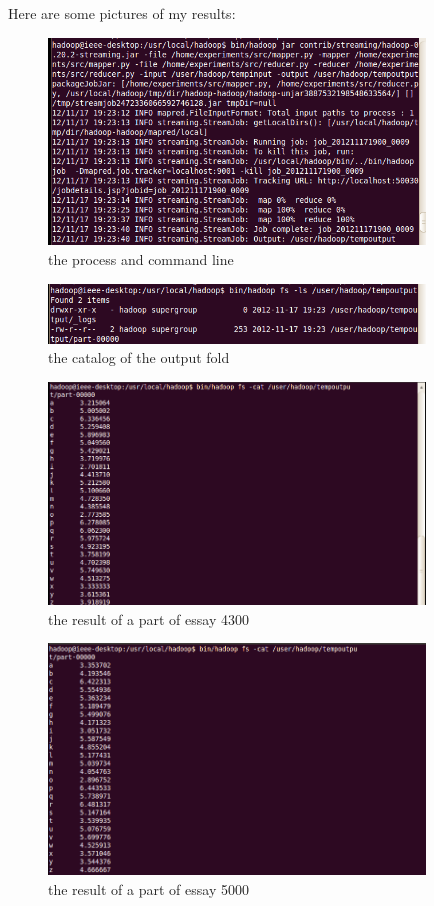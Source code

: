 \documentclass{article}
\begin{document}
Here are some pictures of my results:\\
\begin{figure}[htbp]
\centering
\includegraphics[width=10cm]{6.png}
\caption{the process and command line}
\end{figure}
\begin{figure}[htbp]
\centering
\includegraphics[width=10cm]{7.png}
\caption{the catalog of the output fold}
\end{figure}
\begin{figure}[htbp]
\centering
\includegraphics[width=10cm]{4300.png}
\caption{the result of a part of essay 4300}
\end{figure}
\begin{figure}[htbp]
\centering
\includegraphics[width=10cm]{5000.png}
\caption{the result of a part of essay 5000}
\end{figure}
\end{document}
